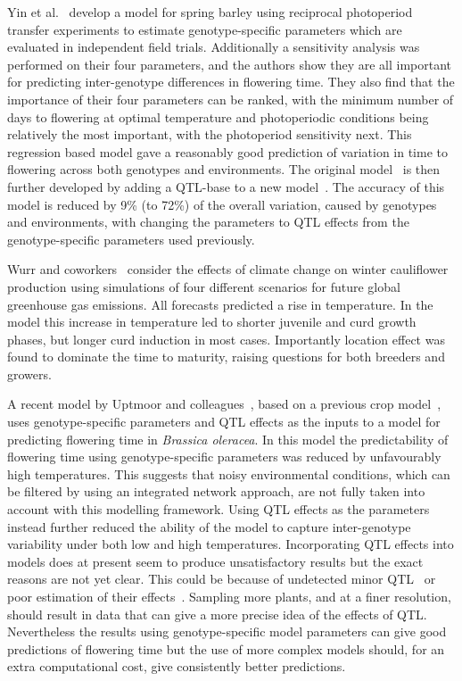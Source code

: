 Yin et al.~\cite{yin2005} develop a model for spring barley using reciprocal photoperiod transfer experiments to estimate genotype-specific parameters which are evaluated in independent field trials.
Additionally a sensitivity analysis was performed on their four parameters, and the authors show they are all important for predicting inter-genotype differences in flowering time.
They also find that the importance of their four parameters can be ranked, with the minimum number of days to flowering at optimal temperature and photoperiodic conditions being relatively the most important, with the photoperiod sensitivity next.
This regression based model gave a reasonably good prediction of variation in time to flowering across both genotypes and environments.
The original model~\cite{yin2005} is then further developed by adding a QTL-base to a new model~\cite{yin2005qtl}.
The accuracy of this model is reduced by 9\% (to 72\%) of the overall variation, caused by genotypes and environments, with changing the parameters to QTL effects from the genotype-specific parameters used previously.

Wurr and coworkers~\cite{wurr2004} consider the effects of climate change on winter cauliflower production using simulations of four different scenarios for future global greenhouse gas emissions.
All forecasts predicted a rise in temperature.
In the model this increase in temperature led to shorter juvenile and curd growth phases, but longer curd induction in most cases.
Importantly location effect was found to dominate the time to maturity, raising questions for both breeders and growers.

A recent model by Uptmoor and colleagues~\cite{uptmoor2012}, based on a previous crop model~\cite{uptmoor2008}, uses genotype-specific parameters and QTL effects as the inputs to a model for predicting flowering time in \emph{Brassica oleracea}.
In this model the predictability of flowering time using genotype-specific parameters was reduced by unfavourably high temperatures.
This suggests that noisy environmental conditions, which can be filtered by using an integrated network approach, are not fully taken into account with this modelling framework.
Using QTL effects as the parameters instead further reduced the ability of the model to capture inter-genotype variability under both low and high temperatures.
Incorporating QTL effects into models does at present seem to produce unsatisfactory results but the exact reasons are not yet clear.
This could be because of undetected minor QTL~\cite{yin2005qtl} or poor estimation of their effects~\cite{uptmoor2009}.
Sampling more plants, and at a finer resolution, should result in data that can give a more precise idea of the effects of QTL.
Nevertheless the results using genotype-specific model parameters can give good predictions of flowering time but the use of more complex models should, for an extra computational cost, give consistently better predictions.


